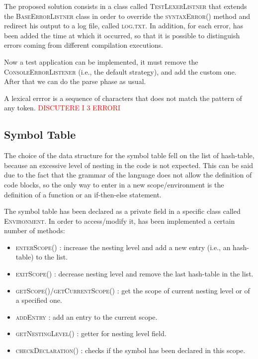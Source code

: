 \documentclass[11pt]{article} %
\newcommand{\ES}{\textcolor{red}}
\begin{document}
The proposed solution consists in a class called \textsc{TestLexerListner} that extends the \textsc{BaseErrorListner} class in order to override the \textsc{syntaxError()} method and redirect his output to a log file, called \textsc{log.txt}. In addition, for each error, has been added the time at which it occurred, so that it is possible to distinguish errors coming from different compilation executions. 

\medskip

Now a test application can be implemented, it must remove the \textsc{ConsoleErrorListener} (i.e., the default strategy), and add the custom one. After that we can do the parse phase as usual.

A lexical errror is a sequence of characters that does not match the pattern of any token.
\ES{DISCUTERE I 3 ERRORI}
%


\subsection{Symbol Table}
The choice of the data structure for the symbol table fell on the list of hash-table, because an excessive level of nesting in the code is not expected. This can be said due to the fact that the grammar of the language does not allow the definition of code blocks, so the only way to enter in a new scope/environment is the definition of a function or an if-then-else statement. 

\medskip

The symbol table has been declared as a private field in a specific class called \textsc{Environment}. In order to access/modify it, has been implemented a certain number of methods:
\begin{itemize}
\item \textsc{enterScope()} : increase the nesting level and add a new entry (i.e., an hash-table) to the list. 
\item \textsc{exitScope()} : decrease nesting level and remove the last hash-table in the list.
\item \textsc{getScope()}/\textsc{getCurrentScope()} : get the scope of current nesting level or of a specified one.
\item \textsc{addEntry} : add an entry to the current scope.
\item \textsc{getNestingLevel()} : getter for nesting level field.
\item \textsc{checkDeclaration()} : checks if the symbol has been declared in this scope. 
\end{itemize}
\end{document}
